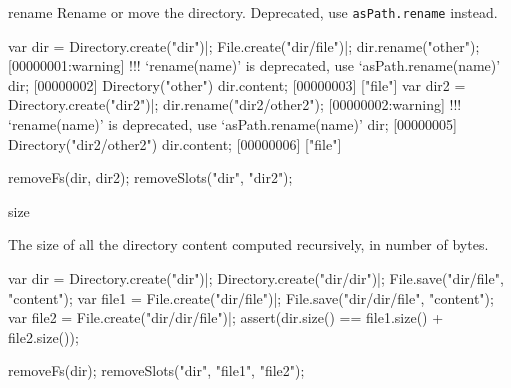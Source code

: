 \begin{urbiscriptapi}
\item[rename] Rename or move the directory. Deprecated, use
  \lstinline|asPath.rename| instead.
\begin{urbiscript}
var dir = Directory.create("dir")|;
File.create("dir/file")|;
dir.rename("other");
[00000001:warning] !!! `rename(name)' is deprecated, use `asPath.rename(name)'
dir;
[00000002] Directory("other")
dir.content;
[00000003] ["file"]
var dir2 = Directory.create("dir2")|;
dir.rename("dir2/other2");
[00000002:warning] !!! `rename(name)' is deprecated, use `asPath.rename(name)'
dir;
[00000005] Directory("dir2/other2")
dir.content;
[00000006] ["file"]
\end{urbiscript}
\begin{urbicomment}
removeFs(dir, dir2);
removeSlots("dir", "dir2");
\end{urbicomment}


\item[size]
  \experimental{}

  The size of all the directory content computed recursively, in number of
  bytes.
\begin{urbiscript}
var dir = Directory.create("dir")|;
Directory.create("dir/dir")|;
File.save("dir/file", "content");
var file1 = File.create("dir/file")|;
File.save("dir/dir/file", "content");
var file2 = File.create("dir/dir/file")|;
assert(dir.size() == file1.size() + file2.size());
\end{urbiscript}
\begin{urbicomment}
removeFs(dir);
removeSlots("dir", "file1", "file2");
\end{urbicomment}
\end{urbiscriptapi}

